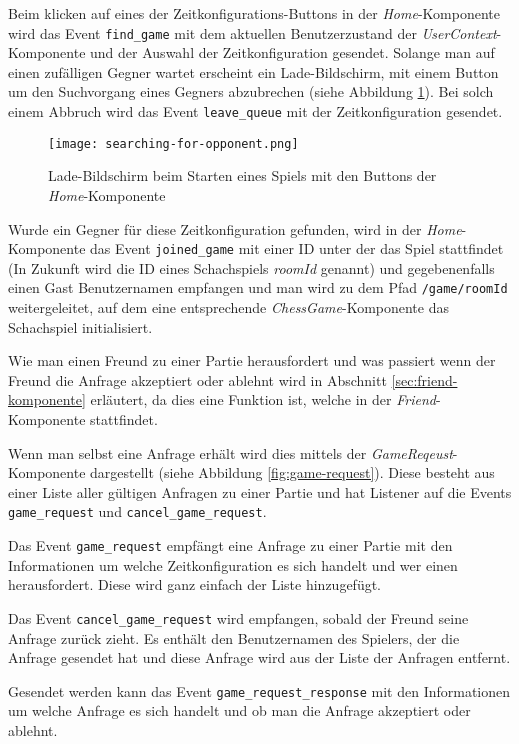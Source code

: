 Beim klicken auf eines der Zeitkonfigurations-Buttons in der \textit{Home}-Komponente wird das Event \verb|find_game| mit dem aktuellen Benutzerzustand der \textit{UserContext}-Komponente und der Auswahl der Zeitkonfiguration gesendet. Solange man auf einen zufälligen Gegner wartet erscheint ein Lade-Bildschirm, mit einem Button um den Suchvorgang eines Gegners abzubrechen (siehe Abbildung \ref{fig:searching-for-opponent}). Bei solch einem Abbruch wird das Event \verb|leave_queue| mit der Zeitkonfiguration gesendet.

\begin{figure}[h]
\centering
\texttt{[image: searching-for-opponent.png]}
\caption{Lade-Bildschirm beim Starten eines Spiels mit den Buttons der \textit{Home}-Komponente}
\label{fig:searching-for-opponent}
\end{figure}

Wurde ein Gegner für diese Zeitkonfiguration gefunden, wird in der \textit{Home}-Komponente das Event \verb|joined_game| mit einer ID unter der das Spiel stattfindet (In Zukunft wird die ID eines Schachspiels \textit{roomId} genannt) und gegebenenfalls einen Gast Benutzernamen empfangen und man wird zu dem Pfad \verb|/game/roomId| weitergeleitet, auf dem eine entsprechende \textit{ChessGame}-Komponente das Schachspiel initialisiert.

Wie man einen Freund zu einer Partie herausfordert und was passiert wenn der Freund die Anfrage akzeptiert oder ablehnt wird in Abschnitt \ref{sec:friend-komponente} erläutert, da dies eine Funktion ist, welche in der \textit{Friend}-Komponente stattfindet.

Wenn man selbst eine Anfrage erhält wird dies mittels der \textit{GameReqeust}-Komponente dargestellt (siehe Abbildung \ref{fig:game-request}). Diese besteht aus einer Liste aller gültigen Anfragen zu einer Partie und hat Listener auf die Events \verb|game_request| und \verb|cancel_game_request|. 

Das Event \verb|game_request| empfängt eine Anfrage zu einer Partie mit den Informationen um welche Zeitkonfiguration es sich handelt und wer einen herausfordert. Diese wird ganz einfach der Liste hinzugefügt. 

Das Event \verb|cancel_game_request| wird empfangen, sobald der Freund seine Anfrage zurück zieht. Es enthält den Benutzernamen des Spielers, der die Anfrage gesendet hat und diese Anfrage wird aus der Liste der Anfragen entfernt.

Gesendet werden kann das Event \verb|game_request_response| mit den Informationen um welche Anfrage es sich handelt und ob man die Anfrage akzeptiert oder ablehnt.
